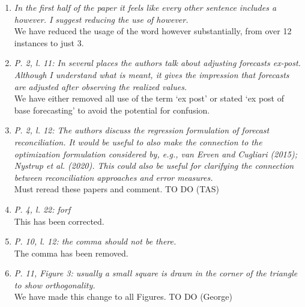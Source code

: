 \documentclass[a4paper,11pt]{article}
\begin{document}
	    \begin{enumerate}
	    
	    \item \textit{In the first half of the paper it feels like every other sentence includes a however. I suggest reducing the use of however.}\\
	    
	    We have reduced the usage of the word however substantially, from over 12 instances to just 3.\\
	    
	    \item \textit{P. 2, l. 11: In several places the authors talk about adjusting forecasts ex-post. Although I understand what is meant, it gives the impression that forecasts are adjusted after observing the realized values.}\\
	    
	    We have either removed all use of the term `ex post' or stated `ex post of base forecasting' to avoid the potential for confusion.\\
	    
	    \item \textit{P. 2, l. 12: The authors discuss the regression formulation of forecast reconciliation. It would be useful to also make the connection to the optimization formulation considered by, e.g., van Erven and Cugliari (2015); Nystrup et al. (2020). This could also be useful for clarifying the connection between reconciliation approaches and error measures.}\\
	    
	    Must reread these papers and comment.  TO DO (TAS)\\
	    
	    \item \textit{P. 4, l. 22: forf}\\
	    This has been corrected.\\
	    
	    \item \textit{P. 10, l. 12: the comma should not be there.}\\
	    The comma has been removed.\\
	    
	    \item \textit{P. 11, Figure 3: usually a small square is drawn in the corner of the triangle to show orthogonality.}\\
	    We have made this change to all Figures. TO DO (George)\\
	    

\end{enumerate}
\end{document}
